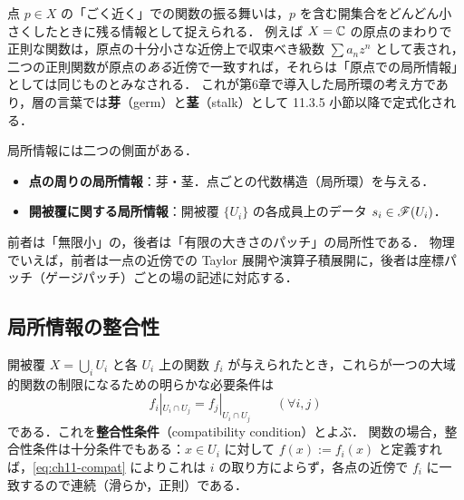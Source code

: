 点 $p\in X$ の「ごく近く」での関数の振る舞いは，$p$ を含む開集合をどんどん小さくしたときに残る情報として捉えられる．
例えば $X=\mathbb{C}$ の原点のまわりで正則な関数は，原点の十分小さな近傍上で収束べき級数 $\sum a_n z^n$ として表され，二つの正則関数が原点の\emph{ある}近傍で一致すれば，それらは「原点での局所情報」としては同じものとみなされる．
これが第6章で導入した局所環の考え方であり，層の言葉では\textbf{芽}（germ）と\textbf{茎}（stalk）として 11.3.5 小節以降で定式化される．

局所情報には二つの側面がある．
\begin{itemize}
  \item \textbf{点の周りの局所情報}：芽・茎．点ごとの代数構造（局所環）を与える．
  \item \textbf{開被覆に関する局所情報}：開被覆 $\{U_i\}$ の各成員上のデータ $s_i\in\mathscr{F}(U_i)$．
\end{itemize}
前者は「無限小」の，後者は「有限の大きさのパッチ」の局所性である．
物理でいえば，前者は一点の近傍での Taylor 展開や演算子積展開に，後者は座標パッチ（ゲージパッチ）ごとの場の記述に対応する．

\subsection{局所情報の整合性}

開被覆 $X=\bigcup_i U_i$ と各 $U_i$ 上の関数 $f_i$ が与えられたとき，これらが一つの大域的関数の制限になるための明らかな必要条件は
\begin{equation}\label{eq:ch11-compat}
  f_i|_{U_i\cap U_j} = f_j|_{U_i\cap U_j}\qquad (\forall i,j)
\end{equation}
である．これを\textbf{整合性条件}（compatibility condition）とよぶ．
関数の場合，整合性条件は十分条件でもある：$x\in U_i$ に対して $f(x) := f_i(x)$ と定義すれば，\eqref{eq:ch11-compat} によりこれは $i$ の取り方によらず，各点の近傍で $f_i$ に一致するので連続（滑らか，正則）である．

